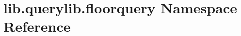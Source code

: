 \hypertarget{namespacelib_1_1querylib_1_1floorquery}{\section{lib.\-querylib.\-floorquery Namespace Reference}
\label{namespacelib_1_1querylib_1_1floorquery}
}
